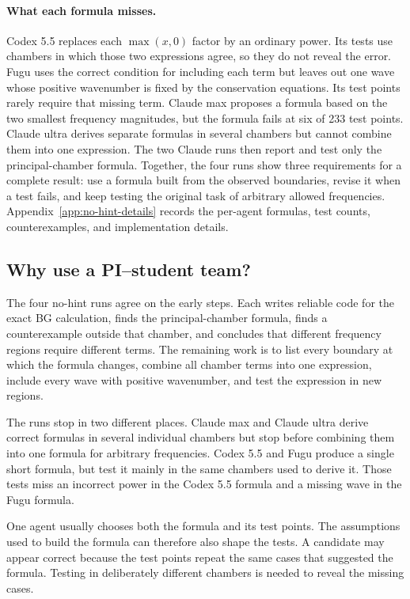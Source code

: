\documentclass{article}
\begin{document}
\paragraph{What each formula misses.}
Codex 5.5 replaces each $\max(x,0)$ factor by an ordinary power. Its tests use
chambers in which those two expressions agree, so they do not reveal the
error. Fugu uses the correct condition for including each term but leaves out
one wave whose positive wavenumber is fixed by the conservation equations. Its
test points rarely require that missing term. Claude max proposes a formula
based on the two smallest frequency magnitudes, but the formula fails at six of 233 test
points. Claude ultra derives separate formulas in several chambers but cannot
combine them into one expression. The two Claude runs then report and test only
the principal-chamber formula. Together, the four runs show three requirements
for a complete result: use a formula built from the observed boundaries, revise
it when a test fails, and keep testing the original task of arbitrary allowed
frequencies. Appendix~\ref{app:no-hint-details}
records the per-agent formulas, test counts, counterexamples, and implementation
details.

\subsection{Why use a PI--student team?}

The four no-hint runs agree on the early steps. Each writes reliable code for
the exact BG calculation, finds the principal-chamber formula, finds a
counterexample outside
that chamber, and concludes that different frequency regions require different
terms. The remaining work is to list every boundary at which the formula
changes, combine all chamber terms into one expression, include every wave
with positive wavenumber, and test the expression in new regions.

The runs stop in two different places. Claude max and Claude ultra derive
correct formulas in several individual chambers but stop before combining them
into one formula for arbitrary frequencies. Codex 5.5 and Fugu produce a
single short formula, but test it mainly in the same chambers used to derive
it. Those tests miss an incorrect power in the Codex 5.5 formula and a missing
wave in the Fugu formula.

One agent usually chooses both the formula and its test points. The assumptions
used to build the formula can therefore also shape the tests. A candidate may
appear correct because the test points repeat the same cases that suggested
the formula. Testing in deliberately different chambers is needed to reveal
the missing cases.
\end{document}
